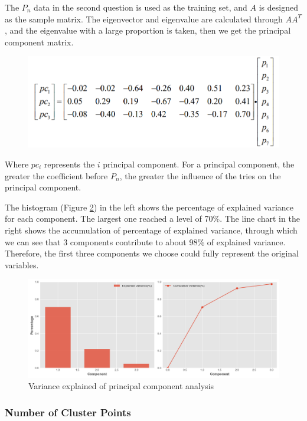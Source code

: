 \documentclass[
  journal=medium,
  manuscript=Report,
  year=2023,
  volume=37,
]{cup-journal}
\begin{document}
The $P_n$ data in the second question is used as the training set, and $A$ is designed as the sample matrix. The eigenvector and eigenvalue are calculated through $AA^T$, and the eigenvalue with a large proportion is taken, then we get the principal component matrix.

\begin{figure}[hbt!]
    \centering
    \includegraphics[width=0.7\linewidth]{pic/主成分.png}
    \label{matrix}
\end{figure}

Where $pc_i$ represents the $i$ principal component. For a principal component, the greater the coefficient before $P_n$, the greater the influence of the tries on the principal component.

The histogram (Figure \ref{pca}) in the left shows the percentage of explained variance for each component. The largest one reached a level of 70\%. The line chart in the right shows the accumulation of percentage of explained variance, through which we can see that 3 components contribute to about 98\% of explained variance. Therefore, the first three components we choose could fully represent the original variables.

\begin{figure}[hbt!]
    \centering
    \includegraphics[width=\linewidth]{pic/pca.png}
    \caption{Variance explained of principal component analysis}
    \label{pca}
\end{figure}

\subsubsection{Number of Cluster Points}
\end{document}
